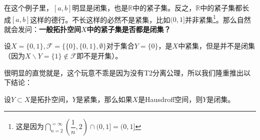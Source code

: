 \documentclass[lang=cn,10pt,device=pad]{elegantbook}
\newcommand{\tp}{\mathscr{F}}
\newcommand{\dajiao}{\displaystyle\bigcap}
\newcommand{\dkh}[1]{\{#1\}}
\newcommand{\chadiao}{\backslash}
\begin{document}
	在这个例子里，$[a,b]$明显是闭集，也是$\mathbb{R}$中的紧子集。反之，$\mathbb{R}$中的紧子集都长成$[a,b]$这样的德行。不长这样的必然不是紧集，比如$(0,1]$并非紧集\footnote{这是因为$\dajiao_{n=2}^{=\infty}(\dfrac{1}{n},2)\cap(0,1] = (0,1]$}。那么自然就会发问：\textbf{一般拓扑空间$X$中的紧子集是否都是闭集？}


\begin{example}[一般拓扑空间中的紧集不一定是闭集]
	设$X=\dkh{0,1},\tp = \dkh{\dkh{0},\dkh{0,1},\emptyset}$对于集合$Y = \dkh{0}$，是$X$中紧集，但是并不是闭集（因为$X\chadiao Y = \dkh{1}\notin \tp$即不是开集）。
\end{example}
很明显的直觉就是，这个玩意不乖是因为没有T2分离公理，所以我们隆重推出以下结论：
\begin{proposition}[Hausdroff空间中的紧集必然是闭集]\label{c3-m1}
	设$Y\subset X$是拓扑空间，$Y$是紧集，那么如果$X$是Hausdroff空间，则$Y$是闭集。
\end{proposition}
\end{document}
